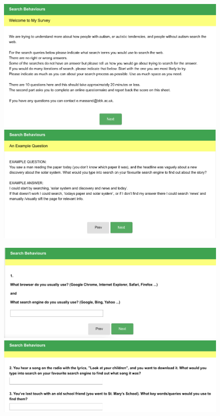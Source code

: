 \documentclass[a4paper, 11pt]{article}
\begin{document}
\begin{figure}[H]
\begin{center}
\includegraphics[scale=0.5]{survey1}\\
\includegraphics[scale=0.5]{survey2}\\
\end{center}
\end{figure}
\newpage
\begin{figure}[H]
\begin{center}
\includegraphics[scale=0.5]{survey3}\\
\includegraphics[scale=0.5]{survey4}\\
\end{center}
\end{figure}
\end{document}
